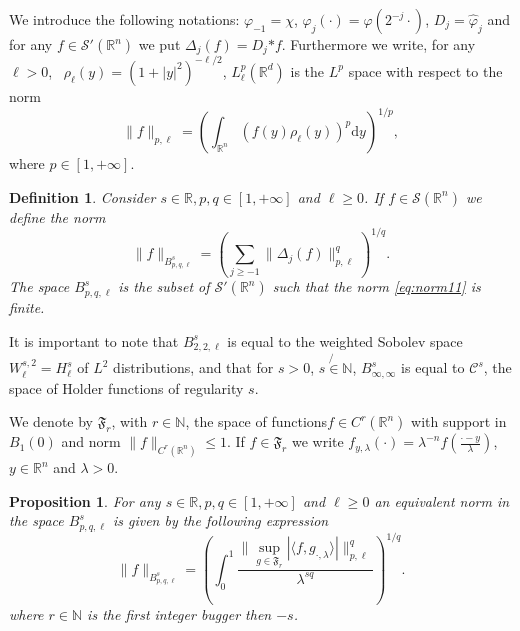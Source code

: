 \documentclass[a4paper,10pt]{article}
\newcommand{\asterisk}{\mathord{*}}
\newcommand{\mathd}{\mathrm{d}}
\newtheorem{definition}{Definition}
\newtheorem{proposition}{Proposition}
{\theorembodyfont{\rmfamily}\newtheorem{remark}{Remark}}
\begin{document}
We introduce the following notations: $\varphi_{- 1} = \chi$, $\varphi_j
(\cdot) = \varphi (2^{- j} \cdot)$, $D_j = \hat{\varphi}_j$ and for any $f \in
\mathcal{S}' (\mathbb{R}^n)$ we put $\Delta_j (f) = D_j \asterisk f$.
Furthermore we write, for any $\ell > 0$, \ $\rho_{\ell} (y) = (1 + | y
|^2)^{- \ell / 2}$, $L^p_{\ell} (\mathbb{R}^d)$ is the $L^p$ space with
respect to the norm
\[ \| f \|_{p, \ell} = \left( \int_{\mathbb{R}^n} (f (y) \rho_{\ell} (y))^p
   \mathd y \right)^{1 / p}, \]
where $p \in [1, + \infty]$.

\begin{definition}
  Consider $s \in \mathbb{R}, p, q \in [1, + \infty]$ and $\ell \geq 0$. If $f
  \in \mathcal{S} (\mathbb{R}^n)$ we define the norm
  \begin{equation}
    \| f \|_{B^s_{p, q, \ell}} = \left( \sum_{j \geq - 1} \| \Delta_j (f)
    \|_{p, \ell}^q \right)^{1 / q} . \label{eq:norm11}
  \end{equation}
  The space $B^s_{p, q, \ell}$ is the subset of $\mathcal{S}' (\mathbb{R}^n)$
  such that the norm {\eqref{eq:norm11}} is finite. 
\end{definition}

\begin{remark}
  It is important to note that $B^s_{2, 2, \ell}$ is equal to the weighted
  Sobolev space $W^{s, 2}_{\ell} = H^s_{\ell}$ of $L^2$ distributions, and
  that for $s > 0$, $s \not{\in} \mathbb{N}$, $B^s_{\infty, \infty}$ is equal
  to $\mathcal{C}^s$, the space of Holder functions of regularity $s$. 
\end{remark}

We denote by $\mathfrak{F}_r$, with $r \in \mathbb{N}$, the space of
functions$f \in C^r (\mathbb{R}^n)$ with support in $B_1 (0)$ and norm $\| f
\|_{\mathfrak{} C^r (\mathbb{R}^n)} \leq 1$. If $f \in \mathfrak{F}_r$ we
write $f_{y, \lambda} (\cdot) = \lambda^{- n} f \left( \frac{\cdot -
y}{\lambda} \right)$, $y \in \mathbb{R}^n$ and $\lambda > 0$. \

\begin{proposition}
  \label{proposition_equivalentnorm}For any $s \in \mathbb{R}, p, q \in [1, +
  \infty]$ and $\ell \geq 0$ an equivalent norm in the space $B^s_{p, q,
  \ell}$ is given by the following expression
  \begin{equation}
    \| f \|_{B^s_{p, q, \ell}} = \left( \int_0^1 \frac{\| \sup_{g \in
    \mathfrak{F}_r} | \langle f, g_{\cdot, \lambda} \rangle | \|_{p,
    \ell}^q}{\lambda^{s q}} \right)^{1 / q} . \label{eq:equivalentnorm}
  \end{equation}
  where $r \in \mathbb{N}$ is the first integer bugger then $- s$.
\end{proposition}
\end{document}
